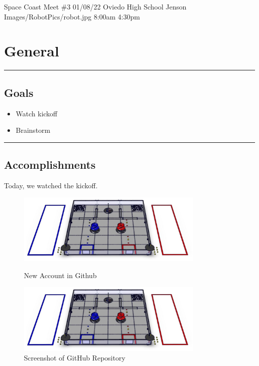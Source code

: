\insertmeeting 
	{Space Coast Meet \#3} 
	{01/08/22}
	{Oviedo High School}
	{Jenson}
	{Images/RobotPics/robot.jpg}
	{8:00am}
  {4:30pm}
	
\section*{General}
\noindent\hfil\rule{\textwidth}{.4pt}\hfil
\subsection*{Goals}
\begin{itemize}
    \item Watch kickoff
    \item Brainstorm   

\end{itemize} 

\noindent\hfil\rule{\textwidth}{.4pt}\hfil

\subsection*{Accomplishments}
Today, we watched the kickoff.
 

\begin{figure}[ht]
\centering
\begin{minipage}[b]{.50\textwidth}
  \centering
  \includegraphics[width=0.8\textwidth]{Meetings/September/09-18-21/field.png}
  \caption{New Account in Github}
  \label{fig:pic1}
\end{minipage}%
\hfill%
\begin{minipage}[b]{.50\textwidth}
  \centering
  \includegraphics[width=0.8\textwidth]{Meetings/September/09-18-21/field.png}
  \caption{Screenshot of GitHub Repository}
  \label{fig:pic2}
\end{minipage}
\end{figure}







